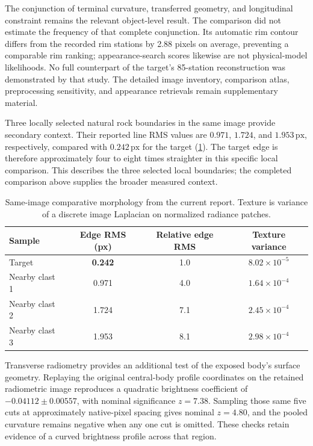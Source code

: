 \documentclass[11pt,letterpaper]{article}
\newcommand{\px}{\,\mathrm{px}}
\begin{document}
The conjunction of terminal curvature, transferred geometry, and longitudinal constraint remains the relevant object-level result. The comparison did not estimate the frequency of that complete conjunction. Its automatic rim contour differs from the recorded rim stations by 2.88 pixels on average, preventing a comparable rim ranking; appearance-search scores likewise are not physical-model likelihoods. No full counterpart of the target's 85-station reconstruction was demonstrated by that study. The detailed image inventory, comparison atlas, preprocessing sensitivity, and appearance retrievals remain supplementary material.

Three locally selected natural rock boundaries in the same image provide secondary context. Their reported line RMS values are \(0.971\), \(1.724\), and \(1.953\px\), respectively, compared with \(0.242\px\) for the target (\cref{tab:rocks}). The target edge is therefore approximately four to eight times straighter in this specific local comparison. This describes the three selected local boundaries; the completed comparison above supplies the broader measured context.

\begin{table}[ht]
\centering\small
\caption{Same-image comparative morphology from the current report. Texture is variance of a discrete image Laplacian on normalized radiance patches.}
\label{tab:rocks}
\begin{tabularx}{\linewidth}{@{}l c c c@{}}
\toprule
\textbf{Sample} & \textbf{Edge RMS (px)} & \textbf{Relative edge RMS} & \textbf{Texture variance} \\
\midrule
Target & \textbf{0.242} & 1.0 & \(8.02\times10^{-5}\) \\
Nearby clast 1 & 0.971 & 4.0 & \(1.64\times10^{-4}\) \\
Nearby clast 2 & 1.724 & 7.1 & \(2.45\times10^{-4}\) \\
Nearby clast 3 & 1.953 & 8.1 & \(2.98\times10^{-4}\) \\
\bottomrule
\end{tabularx}
\end{table}

Transverse radiometry provides an additional test of the exposed body's surface geometry. Replaying the original central-body profile coordinates on the retained radiometric image reproduces a quadratic brightness coefficient of $-0.04112\pm0.00557$, with nominal significance $z=7.38$. Sampling those same five cuts at approximately native-pixel spacing gives nominal $z=4.80$, and the pooled curvature remains negative when any one cut is omitted. These checks retain evidence of a curved brightness profile across that region.
\end{document}
